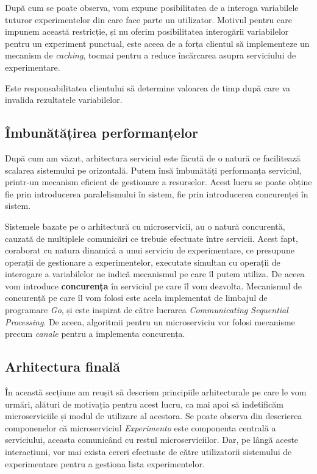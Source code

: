 După cum se poate observa, vom expune posibilitatea de a interoga variabilele tuturor experimentelor din care face parte un utilizator. Motivul pentru care impunem această restricție, și nu oferim posibilitatea interogării variabilelor pentru un experiment punctual, este aceea de a forța clientul să implementeze un mecanism de \textit{caching}, tocmai pentru a reduce încărcarea asupra serviciului de experimentare.

\begin{remark}
	Este responsabilitatea clientului să determine valoarea de timp după care va invalida rezultatele variabilelor.
\end{remark}

\subsection{Îmbunătățirea performanțelor}

După cum am văzut, arhitectura serviciul este făcută de o natură ce facilitează scalarea sistemului pe orizontală. Putem însă îmbunătăți  performanța serviciul, printr-un mecanism eficient de gestionare a resurselor. Acest lucru se poate obține fie prin introducerea paralelismului în sistem, fie prin introducerea concurenței în sistem. 

Sistemele bazate pe o arhitectură cu microservicii, au o natură concurentă, cauzată de multiplele comunicări ce trebuie efectuate între servicii. Acest fapt, coraborat cu natura dinamică a unui serviciu de experimentare, ce presupune operații de gestionare a experimentelor, executate simultan cu operații de interogare a variabilelor ne indică mecanismul pe care îl putem utiliza. De aceea vom introduce \textbf{concurența} în serviciul pe care îl vom dezvolta. Mecanismul de concurență pe care îl vom folosi este acela implementat de limbajul de programare \textit{Go}, și este inspirat de către lucrarea \textit{Communicating Sequential Processing}\cite{hoare_csp}. De aceea, algoritmii pentru un microserviciu vor folosi mecanisme precum \textit{canale} pentru a implementa concurența.

\subsection{Arhitectura finală}

În această secțiune am reușit să descriem principiile arhitecturale pe care le vom urmări, alături de motivația pentru acest lucru, ca mai apoi să indetificăm microserviciile și modul de utilizare al acestora. Se poate observa din descrierea componenelor că microserviciul \textit{Experimento} este componenta centrală a serviciului, aceasta comunicând cu restul microserviciilor. Dar, pe lângă aceste interacțiuni, vor mai exista cereri efectuate de către utilizatorii sistemului de experimentare pentru a gestiona lista experimentelor. 

